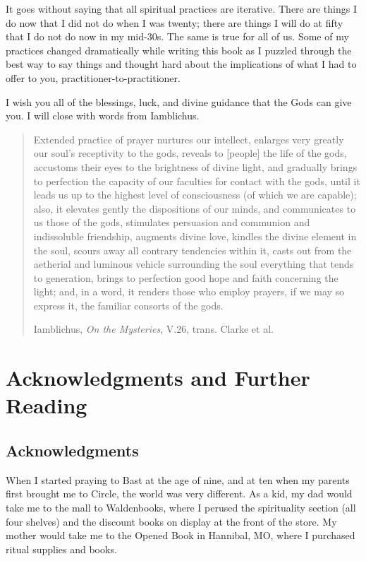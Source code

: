 \documentclass[
]{book}
\begin{document}
It goes without saying that all spiritual practices are iterative. There are things I do now that I did not do when I was twenty; there are things I will do at fifty that I do not do now in my mid-30s. The same is true for all of us. Some of my practices changed dramatically while writing this book as I puzzled through the best way to say things and thought hard about the implications of what I had to offer to you, practitioner-to-practitioner.

I wish you all of the blessings, luck, and divine guidance that the Gods can give you. I will close with words from Iamblichus.

\begin{quote}
Extended practice of prayer nurtures our intellect, enlarges very greatly our soul's receptivity to the gods, reveals to {[}people{]} the life of the gods, accustoms their eyes to the brightness of divine light, and gradually brings to perfection the capacity of our faculties for contact with the gods, until it leads us up to the highest level of consciousness (of which we are capable); also, it elevates gently the dispositions of our minds, and communicates to us those of the gods, stimulates persuasion and communion and indissoluble friendship, augments divine love, kindles the divine element in the soul, scours away all contrary tendencies within it, casts out from the aetherial and luminous vehicle surrounding the soul everything that tends to generation, brings to perfection good hope and faith concerning the light; and, in a word, it renders those who employ prayers, if we may so express it, the familiar consorts of the gods.

Iamblichus, \emph{On the Mysteries}, V.26, trans. Clarke et al.
\end{quote}

\hypertarget{acknowledgments-and-further-reading}{%
\chapter{Acknowledgments and Further Reading}\label{acknowledgments-and-further-reading}}

\hypertarget{acknowledgments}{%
\section{Acknowledgments}\label{acknowledgments}}

When I started praying to Bast at the age of nine, and at ten when my parents first brought me to Circle, the world was very different. As a kid, my dad would take me to the mall to Waldenbooks, where I perused the spirituality section (all four shelves) and the discount books on display at the front of the store. My mother would take me to the Opened Book in Hannibal, MO, where I purchased ritual supplies and books.
\end{document}
